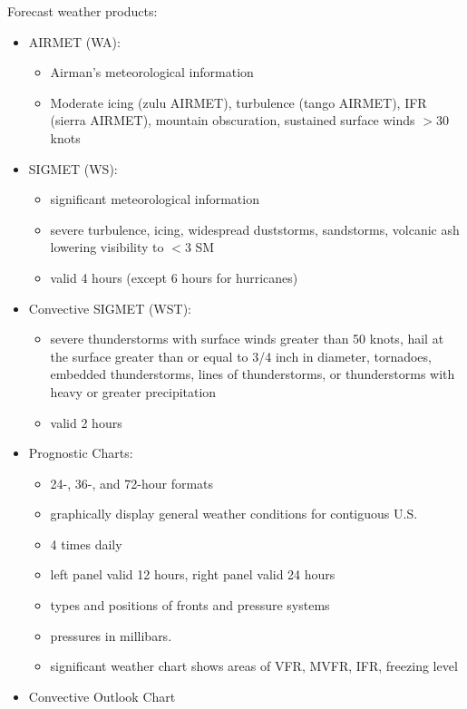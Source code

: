 Forecast weather products:

\begin{itemize}
  \item AIRMET (WA):
    \begin{itemize}
      \item Airman's meteorological information
      \item Moderate icing (zulu AIRMET), turbulence (tango AIRMET), IFR
        (sierra AIRMET), mountain obscuration, sustained surface winds $>$30
        knots
    \end{itemize}
  \item SIGMET (WS):
    \begin{itemize}
      \item significant meteorological information
      \item severe turbulence, icing, widespread duststorms, sandstorms,
        volcanic ash lowering visibility to $<$3 SM
      \item valid 4 hours (except 6 hours for hurricanes)
    \end{itemize}
  \item Convective SIGMET (WST):
    \begin{itemize}
      \item severe thunderstorms with surface winds greater than 50 knots, hail
        at the surface greater than or equal to 3/4 inch in diameter,
        tornadoes, embedded thunderstorms, lines of thunderstorms, or
        thunderstorms with heavy or greater precipitation
      \item valid 2 hours
    \end{itemize}
  \item Prognostic Charts:
    \begin{itemize}
      \item 24-, 36-, and 72-hour formats
      \item graphically display general weather conditions for contiguous U.S.
      \item 4 times daily
      \item left panel valid 12 hours, right panel valid 24 hours
      \item types and positions of fronts and pressure systems
      \item pressures in millibars.
      \item significant weather chart shows areas of VFR, MVFR, IFR, freezing
        level
    \end{itemize}
  \item Convective Outlook Chart

\end{itemize}
